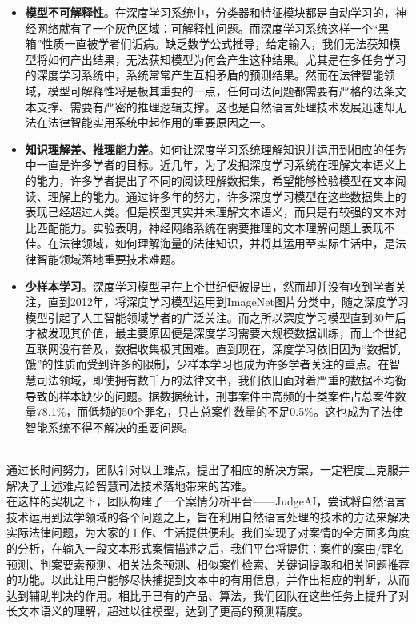 \begin{itemize}
	\item \textbf{模型不可解释性}。在深度学习系统中，分类器和特征模块都是自动学习的，神经网络就有了一个灰色区域：可解释性问题。而深度学习系统这样一个“黑箱”性质一直被学者们诟病。缺乏数学公式推导，给定输入，我们无法获知模型将如何产出结果，无法获知模型为何会产生这种结果。尤其是在多任务学习的深度学习系统中，系统常常产生互相矛盾的预测结果。然而在法律智能领域，模型可解释性将是极其重要的一点，任何司法问题都需要有严格的法条文本支撑、需要有严密的推理逻辑支撑。这也是自然语言处理技术发展迅速却无法在法律智能实用系统中起作用的重要原因之一。
	
	\item \textbf{知识理解差、推理能力差}。如何让深度学习系统理解知识并运用到相应的任务中一直是许多学者的目标。近几年，为了发掘深度学习系统在理解文本语义上的能力，许多学者提出了不同的阅读理解数据集\cite{nguyen2016ms,rajpurkar2016squad,trischler2016newsqa}，希望能够检验模型在文本阅读、理解上的能力。通过许多年的努力，许多深度学习模型在这些数据集上的表现已经超过人类。但是模型其实并未理解文本语义，而只是有较强的文本对比匹配能力\cite{clark2018think}。\citet{kwiatkowski2019natural}实验表明，神经网络系统在需要推理的文本理解问题上表现不佳。在法律领域，如何理解海量的法律知识，并将其运用至实际生活中，是法律智能领域落地重要技术难题。
	
	\item \textbf{少样本学习}。深度学习模型早在上个世纪便被提出，然而却并没有收到学者关注，直到2012年，\citet{krizhevsky2012imagenet}将深度学习模型运用到ImageNet图片分类中，随之深度学习模型引起了人工智能领域学者的广泛关注。而之所以深度学习模型直到30年后才被发现其价值，最主要原因便是深度学习需要大规模数据训练，而上个世纪互联网没有普及，数据收集极其困难。直到现在，深度学习依旧因为“数据饥饿”的性质而受到许多的限制，少样本学习也成为许多学者关注的重点。在智慧司法领域，即使拥有数千万的法律文书，我们依旧面对着严重的数据不均衡导致的样本缺少的问题。据数据统计，刑事案件中高频的十类案件占总案件数量78.1\%，而低频的50个罪名，只占总案件数量的不足0.5\%。这也成为了法律智能系统不得不解决的重要问题。
	

\end{itemize}


~\\
通过长时间努力，团队针对以上难点，提出了相应的解决方案，一定程度上克服并解决了上述难点给智慧司法技术落地带来的苦难。
\\

在这样的契机之下，团队构建了一个案情分析平台——JudgeAI，尝试将自然语言技术运用到法学领域的各个问题之上，旨在利用自然语言处理的技术的方法来解决实际法律问题，为大家的工作、生活提供便利。我们实现了对案情的全方面多角度的分析，在输入一段文本形式案情描述之后，我们平台将提供：案件的案由/罪名预测、判案要素预测、相关法条预测、相似案件检索、关键词提取和相关问题推荐的功能。以此让用户能够尽快捕捉到文本中的有用信息，并作出相应的判断，从而达到辅助判决的作用。相比于已有的产品、算法，我们团队在这些任务上提升了对长文本语义的理解，超过以往模型，达到了更高的预测精度。
